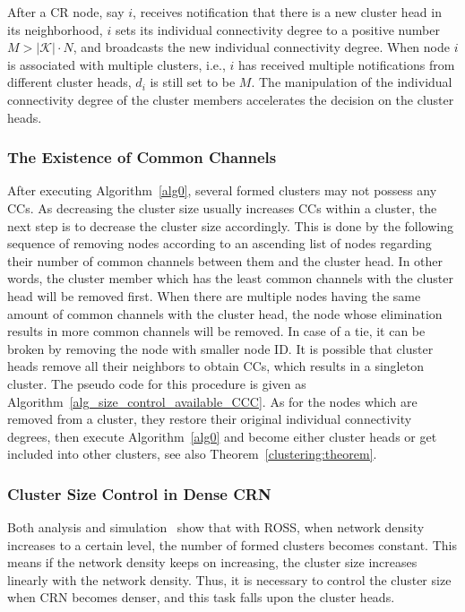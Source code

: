 \documentclass[times]{ettauth}
\newcommand{\ie}{i.e., }
\theoremstyle{mytheoremstyle}
\theoremstyle{mytheoremstyle}
\theoremstyle{mytheoremstyle}
\begin{document}
After a CR node, say $i$, receives notification that there is a new cluster head in its neighborhood, $i$ sets its individual connectivity degree to a positive number $M > |\mathcal{K}| \cdot N$, and broadcasts the new individual connectivity degree. 
When node $i$ is associated with multiple clusters, \ie $i$ has received multiple notifications from different cluster heads, $d_i$ is still set to be $M$. 
The manipulation of the individual connectivity degree of the cluster members accelerates the decision on the cluster heads.





\subsubsection{The Existence of Common Channels}
\label{ross_p1_guarantee_ccc}
After executing Algorithm~\ref{alg0}, several formed clusters may not possess any CCs.
As decreasing the cluster size usually increases CCs within a cluster, the next step is to decrease the cluster size accordingly.
This is done by the following sequence of removing nodes according to an ascending list of nodes regarding their number of common channels between them and the cluster head. 
In other words, the cluster member which has the least common channels with the cluster head will be removed first.
When there are multiple nodes having the same amount of common channels with the cluster head, the node whose elimination results in more common channels will be removed.
In case of a tie, it can be broken by removing the node with smaller node ID.
It is possible that cluster heads remove all their neighbors to obtain CCs, which results in a singleton cluster.
The pseudo code for this procedure is given as Algorithm~\ref{alg_size_control_available_CCC}.
As for the nodes which are removed from a cluster, they restore their original individual connectivity degrees, then execute Algorithm~\ref{alg0} and become either cluster heads or get included into other clusters, see also Theorem~\ref{clustering:theorem}.


\subsubsection{Cluster Size Control in Dense CRN}
\label{ross_p2_cluster_pruning}

Both analysis and simulation~\cite{2017arXiv170404828L} show that with ROSS, when network density increases to a certain level, the number of formed clusters becomes constant.
This means if the network density keeps on increasing, the cluster size increases linearly with the network density.
Thus, it is necessary to control the cluster size when CRN becomes denser, and this task falls upon the cluster heads.
\end{document}
